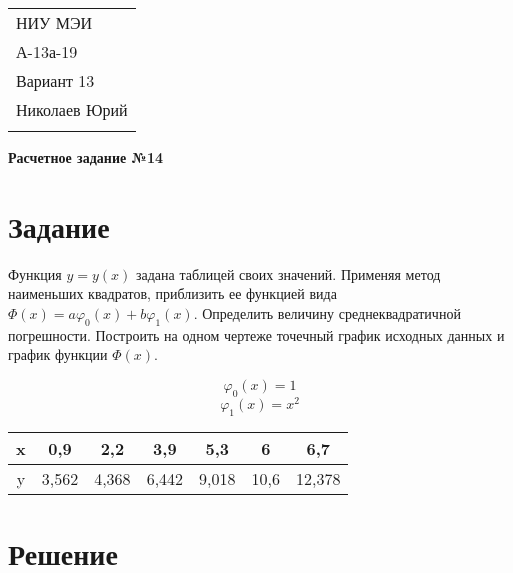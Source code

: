 \documentclass[a4paper,12pt]{article} %
\begin{document}
\thispagestyle{empty} 

\begin{tabular}{p{15.5cm}} 
НИУ МЭИ \\ А-13а-19  \\ Вариант 13 \\ Николаев Юрий\\
\hline 
\\
\end{tabular} 

\vspace*{0.3cm}

\begin{center} 
	{\Large \bf Расчетное задание №14} 
	\vspace{2mm}
\end{center}  

\vspace{0.4cm}


\section{Задание}
Функция $y = y(x)$ задана таблицей своих значений. Применяя метод наименьших квадратов, приблизить ее функцией вида $\Phi(x) = a\varphi_0(x) + b\varphi_1(x)$. Определить величину среднеквадратичной погрешности. Построить на одном чертеже точечный график исходных данных и график функции $\Phi(x)$.

$$\varphi_0(x) = 1$$
$$\varphi_1(x) = x^2$$

\begin{center}
\begin{tabular}{| c | c | c | c | c | c | c |}
\hline
    x & 0,9 & 2,2 & 3,9 & 5,3 & 6 & 6,7 \\ \hline
    y & 3,562 & 4,368 & 6,442 & 9,018 & 10,6 & 12,378 \\
\hline
\end{tabular}
\end{center}

\section{Решение}
\end{document}
